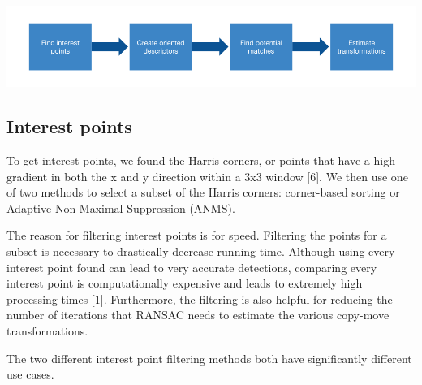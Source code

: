 \documentclass[12pt]{article}
\begin{document}
\includegraphics[width=1.0\linewidth]{./gfx/cm_pipeline.png}

\subsection*{Interest points}
To get interest points, we found the Harris corners, or points that have a high gradient in both the x and y direction within a 3x3 window [6]. We then use one of two methods to select a subset of the Harris corners: corner-based sorting or Adaptive Non-Maximal Suppression (ANMS). 

The reason for filtering interest points is for speed. Filtering the points for a subset is necessary to drastically decrease running time. Although using every interest point found can lead to very accurate detections, comparing every interest point is computationally expensive and leads to extremely high processing times [1]. Furthermore, the filtering is also helpful for reducing the number of iterations that RANSAC needs to estimate the various copy-move transformations.

The two different interest point filtering methods both have significantly different use cases.
\end{document}
